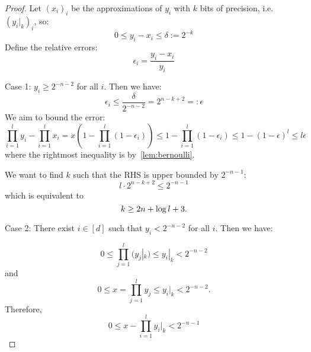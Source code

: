 \begin{proof}

Let \( (x_i)_i \)  be the approximations of \( y_i \) with \( k \) bits of precision, i.e. $(y_i|_k)_i$, so:
\begin{equation}
    0 \leq y_i - x_i \leq \delta := 2^{-k}
\end{equation}
Define the relative errors:
\begin{equation}
    \epsilon_i = \frac{y_i - x_i}{y_i}
\end{equation}

Case 1: 
$y_i\geq 2^{-n-2}$ for all $i$. Then we have:
\begin{equation}
    \epsilon_i \leq \frac{\delta}{2^{-n-2}} = 2^{n - k +2} =:\epsilon
\end{equation}
We aim to bound the error:
\begin{equation}
    \prod_{i=1}^l y_i - \prod_{i=1}^l x_i  = x \left( 1 - \prod_{i=1}^l (1 - \epsilon_i) \right) \leq  1 - \prod_{i=1}^l (1 - \epsilon_i)  \leq  1 - (1 - \epsilon)^l \leq l \epsilon
\end{equation}
where the rightmost inequality is by~\cref{lem:bernoulli}.

We want to find $k$ such that the RHS is upper bounded by $2^{-n-1}$:
\begin{equation}
    l \cdot 2^{n - k+2} \leq 2^{-n-1}
\end{equation}
which is equivalent to
\begin{equation}
    k\geq 2n+\log l +3.\\
\end{equation}

Case 2: There exist $i\in[d]$ such that
$y_i< 2^{-n-2}$ for all $i$. Then we have:

\begin{equation}
    0\leq \prod_{j=1}^l (y_j|_k) \leq y_i|_k < 2^{-n-2}
\end{equation}
and
\begin{equation}
    0 \leq x=\prod_{j=1}^l y_j \leq y_i|_k < 2^{-n-2}.
\end{equation}
Therefore, 
\begin{equation}
    0 \leq x - \prod_{i=1}^l y_i|_k  < 2^{-n-1}
\end{equation}
\end{proof}


